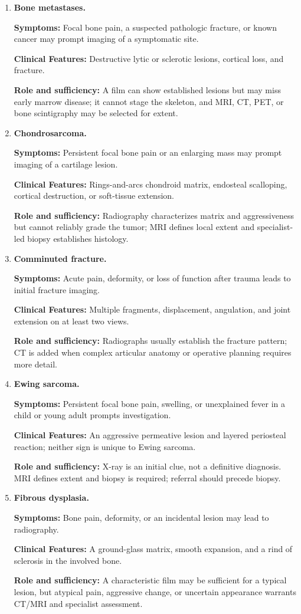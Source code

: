 \begin{enumerate}[leftmargin=*,itemsep=0.45em,topsep=0.4em]
\item \textbf{Bone metastases.}\par\noindent\textbf{Symptoms:} Focal bone pain, a suspected pathologic fracture, or known cancer may prompt imaging of a symptomatic site.\par\noindent\textbf{Clinical Features:} Destructive lytic or sclerotic lesions, cortical loss, and fracture.\par\noindent\textbf{Role and sufficiency:} A film can show established lesions but may miss early marrow disease; it cannot stage the skeleton, and MRI, CT, PET, or bone scintigraphy may be selected for extent.
\item \textbf{Chondrosarcoma.}\par\noindent\textbf{Symptoms:} Persistent focal bone pain or an enlarging mass may prompt imaging of a cartilage lesion.\par\noindent\textbf{Clinical Features:} Rings-and-arcs chondroid matrix, endosteal scalloping, cortical destruction, or soft-tissue extension.\par\noindent\textbf{Role and sufficiency:} Radiography characterizes matrix and aggressiveness but cannot reliably grade the tumor; MRI defines local extent and specialist-led biopsy establishes histology.
\item \textbf{Comminuted fracture.}\par\noindent\textbf{Symptoms:} Acute pain, deformity, or loss of function after trauma leads to initial fracture imaging.\par\noindent\textbf{Clinical Features:} Multiple fragments, displacement, angulation, and joint extension on at least two views.\par\noindent\textbf{Role and sufficiency:} Radiographs usually establish the fracture pattern; CT is added when complex articular anatomy or operative planning requires more detail.
\item \textbf{Ewing sarcoma.}\par\noindent\textbf{Symptoms:} Persistent focal bone pain, swelling, or unexplained fever in a child or young adult prompts investigation.\par\noindent\textbf{Clinical Features:} An aggressive permeative lesion and layered periosteal reaction; neither sign is unique to Ewing sarcoma.\par\noindent\textbf{Role and sufficiency:} X-ray is an initial clue, not a definitive diagnosis. MRI defines extent and biopsy is required; referral should precede biopsy.
\item \textbf{Fibrous dysplasia.}\par\noindent\textbf{Symptoms:} Bone pain, deformity, or an incidental lesion may lead to radiography.\par\noindent\textbf{Clinical Features:} A ground-glass matrix, smooth expansion, and a rind of sclerosis in the involved bone.\par\noindent\textbf{Role and sufficiency:} A characteristic film may be sufficient for a typical lesion, but atypical pain, aggressive change, or uncertain appearance warrants CT/MRI and specialist assessment.

\end{enumerate}
